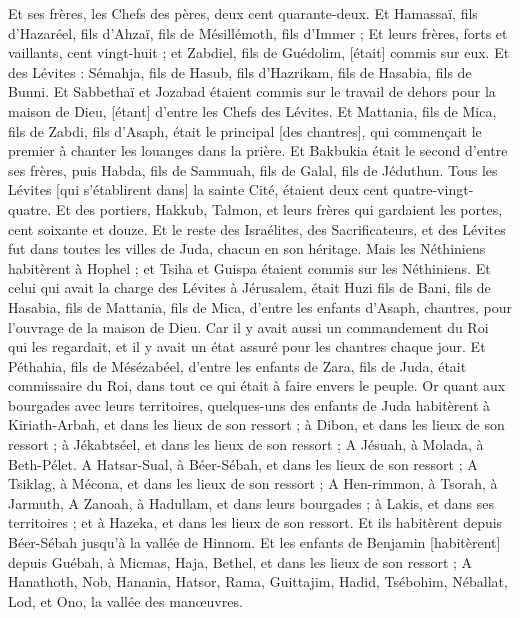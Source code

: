 \begin{multicols}{2}
{Et ses frères, les Chefs des pères, deux cent quarante-deux. Et Hamassaï, fils d'Hazaréel, fils d'Ahzaï, fils de Mésillémoth, fils d'Immer ;
Et leurs frères, forts et vaillants, cent vingt-huit ; et Zabdiel, fils de Guédolim, [était] commis sur eux.
Et des Lévites : Sémahja, fils de Hasub, fils d'Hazrikam, fils de Hasabia, fils de Bunni.
Et Sabbethaï et Jozabad étaient commis sur le travail de dehors pour la maison de Dieu, [étant] d'entre les Chefs des Lévites.
Et Mattania, fils de Mica, fils de Zabdi, fils d'Asaph, était le principal [des chantres], qui commençait le premier à chanter les louanges dans la prière. Et Bakbukia était le second d'entre ses frères, puis Habda, fils de Sammuah, fils de Galal, fils de Jéduthun.
Tous les Lévites [qui s'établirent dans] la sainte Cité, étaient deux cent quatre-vingt-quatre.
Et des portiers, Hakkub, Talmon, et leurs frères qui gardaient les portes, cent soixante et douze.
Et le reste des Israélites, des Sacrificateurs, et des Lévites fut dans toutes les villes de Juda, chacun en son héritage.
Mais les Néthiniens habitèrent à Hophel ; et Tsiha et Guispa étaient commis sur les Néthiniens.
Et celui qui avait la charge des Lévites à Jérusalem, était Huzi fils de Bani, fils de Hasabia, fils de Mattania, fils de Mica, d'entre les enfants d'Asaph, chantres, pour l'ouvrage de la maison de Dieu.
Car il y avait aussi un commandement du Roi qui les regardait, et il y avait un état assuré pour les chantres chaque jour.
Et Péthahia, fils de Mésézabéel, d'entre les enfants de Zara, fils de Juda, était commissaire du Roi, dans tout ce qui était à faire envers le peuple.
Or quant aux bourgades avec leurs territoires, quelques-uns des enfants de Juda habitèrent à Kiriath-Arbah, et dans les lieux de son ressort ; à Dibon, et dans les lieux de son ressort ; à Jékabtséel, et dans les lieux de son ressort ;
A Jésuah, à Molada, à Beth-Pélet.
A Hatsar-Sual, à Béer-Sébah, et dans les lieux de son ressort ;
A Tsiklag, à Mécona, et dans les lieux de son ressort ;
A Hen-rimmon, à Tsorah, à Jarmuth,
A Zanoah, à Hadullam, et dans leurs bourgades ; à Lakis, et dans ses territoires ; et à Hazeka, et dans les lieux de son ressort. Et ils habitèrent depuis Béer-Sébah jusqu'à la vallée de Hinnom.
Et les enfants de Benjamin [habitèrent] depuis Guébah, à Micmas, Haja, Bethel, et dans les lieux de son ressort ;
A Hanathoth, Nob, Hanania,
Hatsor, Rama, Guittajim,
Hadid, Tsébohim, Néballat,
Lod, et Ono, la vallée des manœuvres.
}
\end{multicols}
